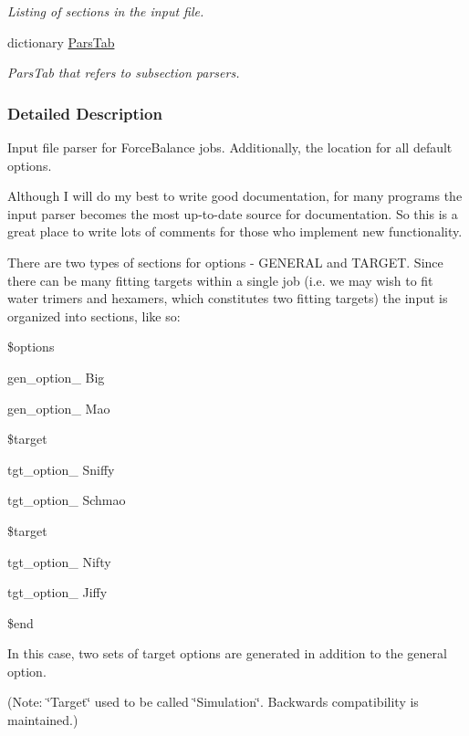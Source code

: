 \begin{DoxyCompactItemize}
\begin{DoxyCompactList}\small\item\em Listing of sections in the input file. \end{DoxyCompactList}\item 
dictionary \hyperlink{namespaceforcebalance_1_1parser_a492c80e361e80dc74aebc13e7a072dfb}{Pars\-Tab}
\begin{DoxyCompactList}\small\item\em Pars\-Tab that refers to subsection parsers. \end{DoxyCompactList}\end{DoxyCompactItemize}


\subsubsection{Detailed Description}
Input file parser for Force\-Balance jobs. Additionally, the location for all default options.

Although I will do my best to write good documentation, for many programs the input parser becomes the most up-\/to-\/date source for documentation. So this is a great place to write lots of comments for those who implement new functionality.

There are two types of sections for options -\/ G\-E\-N\-E\-R\-A\-L and T\-A\-R\-G\-E\-T. Since there can be many fitting targets within a single job (i.\-e. we may wish to fit water trimers and hexamers, which constitutes two fitting targets) the input is organized into sections, like so\-:

\$options\par
 gen\-\_\-option\-\_ Big\par
 gen\-\_\-option\-\_ Mao\par
 \$target\par
 tgt\-\_\-option\-\_ Sniffy\par
 tgt\-\_\-option\-\_ Schmao\par
 \$target\par
 tgt\-\_\-option\-\_ Nifty\par
 tgt\-\_\-option\-\_ Jiffy\par
 \$end

In this case, two sets of target options are generated in addition to the general option.

(Note\-: \char`\"{}\-Target\char`\"{} used to be called \char`\"{}\-Simulation\char`\"{}. Backwards compatibility is maintained.)


